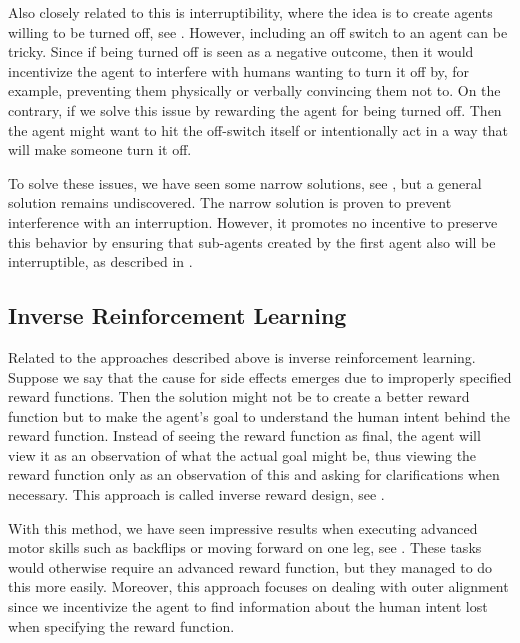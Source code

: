 \documentclass[12pt,A4]{report}
\theoremstyle{definition}
\begin{document}
Also closely related to this is interruptibility, where the idea is to create agents willing to be turned off, see \citet{Interruptible}. However, including an off switch to an agent can be tricky. Since if being turned off is seen as a negative outcome, then it would incentivize the agent to interfere with humans wanting to turn it off by, for example, preventing them physically or verbally convincing them not to. On the contrary, if we solve this issue by rewarding the agent for being turned off. Then the agent might want to hit the off-switch itself or intentionally act in a way that will make someone turn it off. 

To solve these issues, we have seen some narrow solutions, see \citet{Hadfield-Menell, Carey}, but a general solution remains undiscovered. The narrow solution is proven to prevent interference with an interruption. However, it promotes no incentive to preserve this behavior by ensuring that sub-agents created by the first agent also will be interruptible, as described in \citet{co-founding}.  

\subsection{Inverse Reinforcement Learning}
Related to the approaches described above is inverse reinforcement learning. Suppose we say that the cause for side effects emerges due to improperly specified reward functions. Then the solution might not be to create a better reward function but to make the agent's goal to understand the human intent behind the reward function. Instead of seeing the reward function as final, the agent will view it as an observation of what the actual goal might be, thus viewing the reward function only as an observation of this and asking for clarifications when necessary. This approach is called inverse reward design, see \citet{Hadfield-Menell2}.

With this method, we have seen impressive results when executing advanced motor skills such as backflips or moving forward on one leg, see \citet{Christiano}. These tasks would otherwise require an advanced reward function, but they managed to do this more easily. Moreover, this approach focuses on dealing with outer alignment since we incentivize the agent to find information about the human intent lost when specifying the reward function. 
\end{document}
